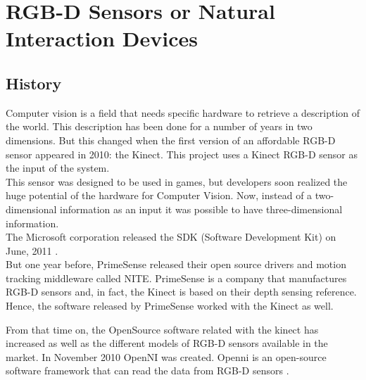 



\section{RGB-D Sensors or Natural Interaction Devices}

\subsection{History}

Computer vision is a field that needs specific hardware to retrieve a description of the world. This description has been done for a number of years in two dimensions. But this changed when the first version of an affordable RGB-D sensor appeared in 2010: the Kinect. This project uses a Kinect RGB-D sensor as the input of the system.
\\

This sensor was designed to be used in games, but developers soon realized the huge potential of the hardware for Computer Vision.  
Now, instead of a two-dimensional information as an input it was possible to have three-dimensional information. 
\\

The Microsoft corporation released the SDK (Software Development Kit) on June, 2011 \cite{kinectSDK}.
\\

But one year before, PrimeSense released their open source drivers and motion tracking middleware called NITE\cite{NITE}. 
PrimeSense is a company that manufactures RGB-D sensors and, in fact, the Kinect is based on their depth sensing reference. Hence, the software released by PrimeSense worked with the Kinect as well. 

From that time on, the OpenSource software related with the kinect has increased as well as the different models of RGB-D sensors available in the market.
In November 2010 OpenNI was created. Openni is an open-source software framework that can read the data from RGB-D sensors \cite{openni}.  


